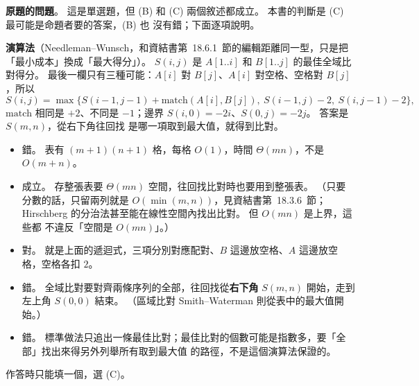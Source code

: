 \begin{pastsoln}
\textbf{原題的問題}。 這是單選題，但 (B) 和 (C) 兩個敘述都成立。 本書的判斷是 (C) 最可能是命題者要的答案，(B) 也
沒有錯；下面逐項說明。

\textbf{演算法}（Needleman--Wunsch，和資結書第~18.6.1~節的編輯距離同一型，只是把「最小成本」換成「最大得分」）。
$S(i, j)$ 是 $A[1..i]$ 和 $B[1..j]$ 的最佳全域比對得分。 最後一欄只有三種可能：$A[i]$ 對 $B[j]$、$A[i]$ 對空格、空格對
$B[j]$，所以
\[
S(i, j) = \max\bigl\{S(i-1, j-1) + \mathrm{match}(A[i], B[j]),\ S(i-1, j) - 2,\ S(i, j-1) - 2\bigr\},
\]
$\mathrm{match}$ 相同是 $+2$、不同是 $-1$；邊界 $S(i, 0) = -2i$、$S(0, j) = -2j$。 答案是 $S(m, n)$，從右下角往回找
是哪一項取到最大值，就得到比對。

\begin{itemize}
\item[(A)] 錯。 表有 $(m + 1)(n + 1)$ 格，每格 $O(1)$，時間 $\Theta(mn)$，不是 $O(m + n)$。
\item[(B)] 成立。 存整張表要 $\Theta(mn)$ 空間，往回找比對時也要用到整張表。 （只要分數的話，只留兩列就是
$O(\min(m, n))$，見資結書第~18.3.6~節；Hirschberg 的分治法甚至能在線性空間內找出比對。 但 $O(mn)$ 是上界，這些都
不違反「空間是 $O(mn)$」。）
\item[(C)] 對。 就是上面的遞迴式，三項分別對應配對、$B$ 這邊放空格、$A$ 這邊放空格，空格各扣 $2$。
\item[(D)] 錯。 全域比對要對齊兩條序列的全部，往回找從\textbf{右下角} $S(m, n)$ 開始，走到左上角 $S(0, 0)$ 結束。
（區域比對 Smith--Waterman 則從表中的最大值開始。）
\item[(E)] 錯。 標準做法只追出一條最佳比對；最佳比對的個數可能是指數多，要「全部」找出來得另外列舉所有取到最大值
的路徑，不是這個演算法保證的。
\end{itemize}
作答時只能填一個，選 (C)。
\end{pastsoln}
